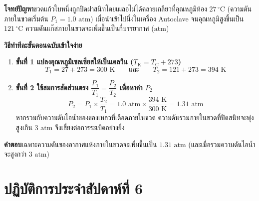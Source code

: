\begin{worked}
\textbf{โจทย์ปัญหา}\quad ขวดแก้วใบหนึ่งถูกปิดฝาสนิทโดยเผลอไม่ได้คลายเกลียวที่อุณหภูมิห้อง $27\,^\circ\text{C}$ (ความดันภายในขวดเริ่มต้น $P_1 = 1.0\text{ atm}$) เมื่อนำเข้าไปนึ่งในเครื่อง Autoclave จนอุณหภูมิสูงขึ้นเป็น $121\,^\circ\text{C}$ ความดันแก๊สภายในขวดจะเพิ่มขึ้นเป็นกี่บรรยากาศ ($\text{atm}$)

\textbf{วิธีทำทีละขั้นตอนฉบับเข้าใจง่าย}
\begin{enumerate}
    \item \textbf{ขั้นที่ 1 แปลงอุณหภูมิเซลเซียสให้เป็นเคลวิน ($T_{\text{K}} = T_{\text{C}} + 273$)}
    \[
        T_1 = 27 + 273 = 300\text{ K} \qquad \text{และ} \qquad T_2 = 121 + 273 = 394\text{ K}
    \]
    \item \textbf{ขั้นที่ 2 ใช้สมการสัดส่วนตรง $\dfrac{P_1}{T_1} = \dfrac{P_2}{T_2}$ เพื่อหาค่า $P_2$}
    \[
        P_2 = P_1 \times \frac{T_2}{T_1} = 1.0\text{ atm} \times \frac{394\text{ K}}{300\text{ K}} = 1.31\text{ atm}
    \]
    หากรวมกับความดันไอน้ำของของเหลวที่เดือดภายในขวด ความดันรวมภายในขวดที่ปิดสนิทจะพุ่งสูงเกิน $3\text{ atm}$ จึงเสี่ยงต่อการระเบิดอย่างยิ่ง
\end{enumerate}
\textbf{คำตอบ}\quad เฉพาะความดันของอากาศแห้งภายในขวดจะเพิ่มขึ้นเป็น $1.31\text{ atm}$ (และเมื่อรวมความดันไอน้ำจะสูงกว่า $3\text{ atm}$)
\end{worked}

\section{ปฏิบัติการประจำสัปดาห์ที่ 6}


